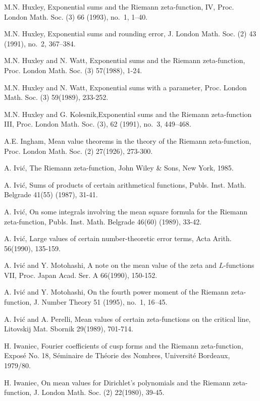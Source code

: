 \begin{thebibliography}{99}
 M.N. Huxley, Exponential sums and the Riemann zeta-function, IV,  Proc. London Math. Soc. (3) 66 (1993), no.~1, 1--40.

 M.N. Huxley, Exponential sums and rounding error,  J. London Math. Soc. (2) 43 (1991), no.~2, 367--384.

 M.N. Huxley and N. Watt, Exponential sums and the Riemann zeta-function, Proc. London Math. Soc. (3) 57(1988), 1-24.

 M.N. Huxley and N. Watt, Exponential sums with a parameter, Proc. London Math. Soc. (3) 59(1989), 233-252.

 M.N. Huxley and G. Kolesnik,\pageoriginale Exponential sums and the Riemann zeta-function III, Proc. London Math. Soc. (3), 62 (1991), no.~3, 449--468.

 A.E. Ingham, Mean value theorems in the theory of the Riemann zeta-function, Proc. London Math. Soc. (2) 27(1926), 273-300.

 A. Ivi\'c, The Riemann zeta-function, John Wiley \& Sons, New York, 1985.

 A. Ivi\'c, Sums of products of certain arithmetical functions, Publs. Inst. Math. Belgrade 41(55) (1987), 31-41.

 A. Ivi\'c, On some integrals involving the mean square formula for the Riemann zeta-function, Publs. Inst. Math. Belgrade 46(60) (1989), 33-42.

 A. Ivi\'c, Large values of certain number-theoretic error terms, Acta Arith. 56(1990), 135-159.

 A. Ivi\'c and Y. Motohashi, A note on the mean value of the zeta and $L$-functions VII, Proc. Japan Acad. Ser. A 66(1990), 150-152.

 A. Ivi\'c and Y. Motohashi,      On the fourth power moment of the Riemann zeta-function, J. Number Theory 51 (1995), no.~1, 16--45.

 A. Ivi\'c and A. Perelli, Mean values of certain zeta-functions on the critical line, Litovskij Mat. Sbornik 29(1989), 701-714.

 H. Iwaniec, Fourier coefficients of cusp forms and the Riemann zeta-function, Expos\'e No. 18, S\'eminaire de Th\'eorie des Nombres, Universit\'e Bordeaux, 1979/80.

 H. Iwaniec, On mean values for Dirichlet's polynomials and the Riemann zeta-function, J. London Math. Soc. (2) 22(1980), 39-45.


\end{thebibliography}
